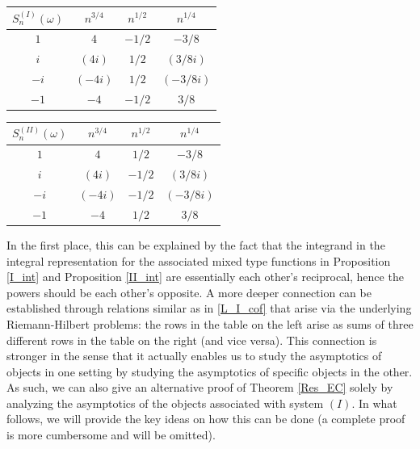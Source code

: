 \documentclass[a4paper,12pt,oneside]{article}
\theoremstyle{definition}
\begin{document}
\begin{center}
\begin{tabular}{c||c|c|c}
    $S_n^{(I)}(\omega)$ & $n^{3/4}$ & $n^{1/2}$ & $n^{1/4}$ \\ \hline
    $1$ & $4$ & $-1/2$ & $-3/8$ \\
    $i$ & $(4i)$ & $1/2$ & $(3/8i)$ \\
    $-i$ & $(-4i)$ & $1/2$ & $(-3/8i)$ \\
    $-1$ & $-4$ & $-1/2$ & $3/8$ \\
\end{tabular}
\qquad
\begin{tabular}{c||c|c|c}
    $S_n^{(II)}(\omega)$ & $n^{3/4}$ & $n^{1/2}$ & $n^{1/4}$ \\ \hline
    $1$ & $4$ & $1/2$ & $-3/8$ \\
    $i$ & $(4i)$ & $-1/2$ & $(3/8i)$ \\
    $-i$ & $(-4i)$ & $-1/2$ & $(-3/8i)$ \\
    $-1$ & $-4$ & $1/2$ & $3/8$ \\
\end{tabular}
\end{center}

In the first place, this can be explained by the fact that the integrand in the integral representation for the associated mixed type functions in Proposition \ref{I_int} and Proposition \ref{II_int} are essentially each other's reciprocal, hence the powers should be each other's opposite. A more deeper connection can be established through relations similar as in \eqref{L_I_cof} that arise via the underlying Riemann-Hilbert problems: the rows in the table on the left arise as sums of three different rows in the table on the right (and vice versa). This connection is stronger in the sense that it actually enables us to study the asymptotics of objects in one setting by studying the asymptotics of specific objects in the other. As such, we can also give an alternative proof of Theorem \ref{Res_EC} solely by analyzing the asymptotics of the objects associated with system $(I)$. In what follows, we will provide the key ideas on how this can be done (a complete proof is more cumbersome and will be omitted).
\medbreak
\end{document}
